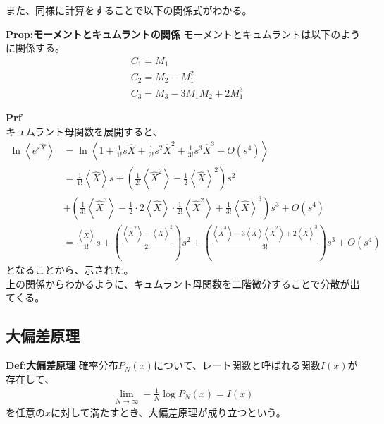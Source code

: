 \documentclass[a4paper,11pt]{jsarticle}
\numberwithin{equation}{section}
\begin{document}
また、同様に計算をすることで以下の関係式がわかる。
  \begin{itembox}[l]{\textbf{Prop:モーメントとキュムラントの関係}}
    モーメントとキュムラントは以下のように関係する。
    \begin{align}
      &C_1 = M_1\\
      &C_2 = M_2 - M_1^2\label{eq:cumulant2}\\
      &C_3 = M_3 - 3M_1M_2 + 2M_1^3
    \end{align}
  \end{itembox}
  \textbf{Prf}\\
  キュムラント母関数を展開すると、
  \begin{align}
    \ln \left\langle e^{s\hat{X}} \right\rangle &= \ln \left\langle 1 + \frac{1}{1!}s\hat{X} + \frac{1}{2!}s^2\hat{X}^2 + \frac{1}{3!}s^3\hat{X}^3 + O(s^4) \right\rangle \nonumber \\
    &= \frac{1}{1!} \left\langle \hat{X} \right\rangle s + \left( \frac{1}{2!} \left\langle \hat{X}^2 \right\rangle - \frac{1}{2} \left\langle \hat{X} \right\rangle^2 \right) s^2 \\
    &+ \left( \frac{1}{3!} \left\langle \hat{X}^3 \right\rangle - \frac{1}{2} \cdot 2 \left\langle \hat{X} \right\rangle \cdot \frac{1}{2!} \left\langle \hat{X}^2 \right\rangle + \frac{1}{3!} \left\langle \hat{X} \right\rangle^3 \right) s^3 + O(s^4) \nonumber \\
    &= \frac{\left\langle \hat{X} \right\rangle}{1!} s + \left( \frac{\left\langle \hat{X}^2 \right\rangle - \left\langle \hat{X} \right\rangle^2}{2!} \right) s^2 + \left( \frac{\left\langle \hat{X}^3 \right\rangle - 3 \left\langle \hat{X} \right\rangle \left\langle \hat{X}^2 \right\rangle + 2 \left\langle \hat{X} \right\rangle^3}{3!} \right) s^3 + O(s^4)
  \end{align}
  となることから、示された。\hfill\qedsymbol\\
  
  上の関係からわかるように、キュムラント母関数を二階微分することで分散が出てくる。
  
  \subsection{大偏差原理}
  \begin{itembox}[l]{\textbf{Def:大偏差原理}}
    確率分布$P_N(x)$について、レート関数と呼ばれる関数$I(x)$が存在して、
    \begin{align}
      \lim_{N \to \infty} -\frac{1}{N} \log P_N(x) = I(x)
    \end{align}
    を任意の$x$に対して満たすとき、大偏差原理が成り立つという。
  \end{itembox}
  
\end{document}
